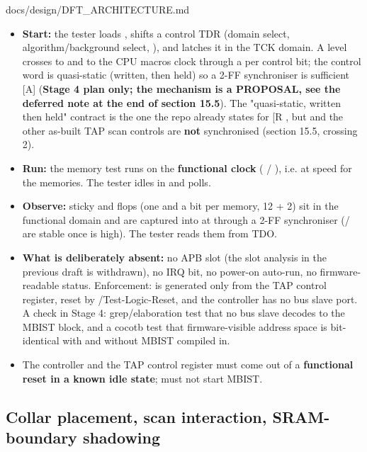 \begin{relocated}{docs/design/DFT_ARCHITECTURE.md}
\begin{itemize}
\tightlist
\item
  \textbf{Start:} the tester loads , shifts a control
  TDR (domain select, algorithm/\allowbreak{}background select,
  ), and  latches it in the TCK domain. A
   level crosses to  and to the CPU
  macro\textquotesingle s clock through a  per control
  bit; the control word is quasi-static (written, then held) so a 2-FF
  synchroniser is sufficient {[}A{]} (\textbf{Stage 4 plan only; the
  mechanism is a PROPOSAL, see the deferred note at the end of section
  15.5}). The "quasi-static, written then held" contract is the one the
  repo already states for  {[}R
  \code{cdc_reset_sync.sv:48-49}{]}, but  and the other
  as-built TAP scan controls are \textbf{not} synchronised (section
  15.5, crossing 2).
\item
  \textbf{Run:} the memory test runs on the \textbf{functional clock}
  ( / ), i.e. at speed for the
  memories. The tester idles in  and polls.
\item
  \textbf{Observe:} sticky  and  flops (one
   and a  bit per memory, 12 + 2) sit in the
  functional domain and are captured into  at
   through a 2-FF synchroniser (/
  are stable once  is high). The tester reads them from TDO.
\item
  \textbf{What is deliberately absent:} no APB slot (the
   slot analysis in the previous draft is withdrawn),
  no IRQ bit, no power-on auto-run, no firmware-readable status.
  Enforcement:  is generated only from the TAP control
  register, reset by /\allowbreak{}Test-Logic-Reset, and
  the controller has no bus slave port. A check in Stage 4:
  grep/\allowbreak{}elaboration test that no  bus slave
  decodes to the MBIST block, and a cocotb test that firmware-visible
  address space is bit-identical with and without MBIST compiled in.
\item
  The controller and the TAP control register must come out of a
  \textbf{functional reset in a known idle state};  must
  not start MBIST.
\end{itemize}

\subsection{Collar placement, scan interaction, SRAM-boundary
shadowing}\label{tm:ch:dft-architecture:63-collar-placement-scan-interaction-sram-boundary-shadowing}


\end{relocated}
